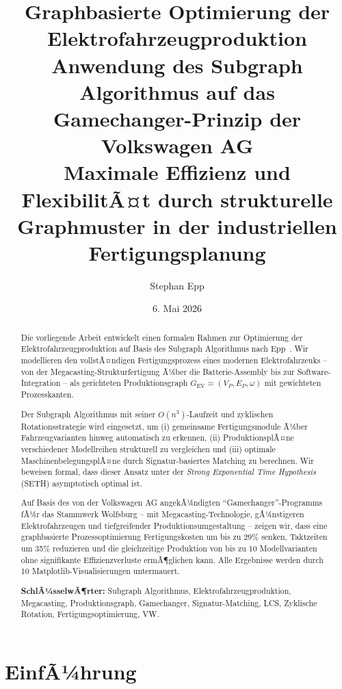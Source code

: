 ﻿\documentclass[a4paper,12pt]{article}
\title{\textbf{Graphbasierte Optimierung der Elektrofahrzeugproduktion}\\[0.5em]
\large Anwendung des Subgraph Algorithmus auf das\\
Gamechanger-Prinzip der Volkswagen AG\\[0.5em]
\normalsize Maximale Effizienz und FlexibilitÃ¤t durch strukturelle\\
Graphmuster in der industriellen Fertigungsplanung}
\author{Stephan Epp\\}
\date{6. Mai 2026}
\theoremstyle{definition}
\begin{document}
\maketitle
\thispagestyle{empty}

\begin{abstract}
Die vorliegende Arbeit entwickelt einen formalen Rahmen zur Optimierung der
Elektrofahrzeugproduktion auf Basis des Subgraph Algorithmus nach Epp~\cite{epp2026}.
Wir modellieren den vollstÃ¤ndigen Fertigungsprozess eines modernen Elektrofahrzeuks --
von der Megacasting-Strukturfertigung Ã¼ber die Batterie-Assembly bis zur
Software-Integration -- als gerichteten Produktionsgraph $G_{\mathrm{EV}} = (V_P, E_P, \omega)$
mit gewichteten Prozesskanten.

Der Subgraph Algorithmus mit seiner $O(n^3)$-Laufzeit und zyklischen Rotationsstrategie
wird eingesetzt, um (i) gemeinsame Fertigungsmodule Ã¼ber Fahrzeugvarianten hinweg
automatisch zu erkennen, (ii) ProduktionsplÃ¤ne verschiedener Modellreihen strukturell
zu vergleichen und (iii) optimale MaschinenbelegungsplÃ¤ne durch Signatur-basiertes
Matching zu berechnen. Wir beweisen formal, dass dieser Ansatz unter der
\emph{Strong Exponential Time Hypothesis} (SETH) asymptotisch optimal ist.

Auf Basis des von der Volkswagen AG angekÃ¼ndigten ``Gamechanger''-Programms
fÃ¼r das Stammwerk Wolfsburg -- mit Megacasting-Technologie, gÃ¼nstigeren
Elektrofahrzeugen und tiefgreifender Produktionsumgestaltung -- zeigen wir,
dass eine graphbasierte Prozessoptimierung Fertigungskosten um bis zu 29\%
senken, Taktzeiten um 35\% reduzieren und die gleichzeitige Produktion
von bis zu 10 Modellvarianten ohne signifikante Effizienzverluste ermÃ¶glichen kann.
Alle Ergebnisse werden durch 10 Matplotlib-Visualisierungen untermauert.

\medskip
\noindent\textbf{SchlÃ¼sselwÃ¶rter:} Subgraph Algorithmus, Elektrofahrzeugproduktion,
Megacasting, Produktionsgraph, Gamechanger, Signatur-Matching, LCS,
Zyklische Rotation, Fertigungsoptimierung, VW.
\end{abstract}

\newpage
\tableofcontents
\newpage

\section{EinfÃ¼hrung}
\end{document}
